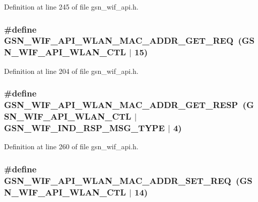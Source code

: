 Definition at line 245 of file gsn\_\-wif\_\-api.h.

\hypertarget{a00606_af67ddc2f5d26e57baaadfc05d1928cb0}{
\subsubsection[{GSN\_\-WIF\_\-API\_\-WLAN\_\-MAC\_\-ADDR\_\-GET\_\-REQ}]{\setlength{\rightskip}{0pt plus 5cm}\#define GSN\_\-WIF\_\-API\_\-WLAN\_\-MAC\_\-ADDR\_\-GET\_\-REQ~(GSN\_\-WIF\_\-API\_\-WLAN\_\-CTL $|$ 15)}}
\label{a00606_af67ddc2f5d26e57baaadfc05d1928cb0}


Definition at line 204 of file gsn\_\-wif\_\-api.h.

\hypertarget{a00606_ab6d7629ede4a3c3793e60e919097f563}{
\subsubsection[{GSN\_\-WIF\_\-API\_\-WLAN\_\-MAC\_\-ADDR\_\-GET\_\-RESP}]{\setlength{\rightskip}{0pt plus 5cm}\#define GSN\_\-WIF\_\-API\_\-WLAN\_\-MAC\_\-ADDR\_\-GET\_\-RESP~(GSN\_\-WIF\_\-API\_\-WLAN\_\-CTL $|$ GSN\_\-WIF\_\-IND\_\-RSP\_\-MSG\_\-TYPE $|$ 4)}}
\label{a00606_ab6d7629ede4a3c3793e60e919097f563}


Definition at line 260 of file gsn\_\-wif\_\-api.h.

\hypertarget{a00606_a0ea898da7168e443e768b28a6fd0bbd7}{
\subsubsection[{GSN\_\-WIF\_\-API\_\-WLAN\_\-MAC\_\-ADDR\_\-SET\_\-REQ}]{\setlength{\rightskip}{0pt plus 5cm}\#define GSN\_\-WIF\_\-API\_\-WLAN\_\-MAC\_\-ADDR\_\-SET\_\-REQ~(GSN\_\-WIF\_\-API\_\-WLAN\_\-CTL $|$ 14)}}
\label{a00606_a0ea898da7168e443e768b28a6fd0bbd7}


